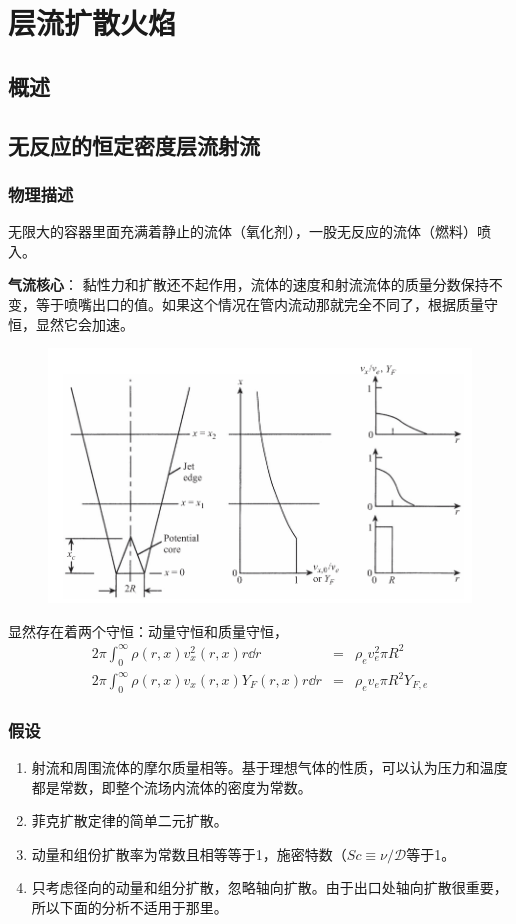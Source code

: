 
\section{层流扩散火焰}

\subsection{概述}
\subsection{无反应的恒定密度层流射流}
\subsubsection{物理描述}
无限大的容器里面充满着静止的流体（氧化剂），一股无反应的流体（燃料）喷入。

\textbf{气流核心}： 黏性力和扩散还不起作用，流体的速度和射流流体的质量分数保持不变，等于喷嘴出口的值。{\tiny 如果这个情况在管内流动那就完全不同了，根据质量守恒，显然它会加速。}

\begin{figure}[H]
    \centering
    \includegraphics[width=.3\textwidth]{img/laminar_jet.png}
\end{figure}

显然存在着两个守恒：动量守恒和质量守恒，
\begin{eqnarray}
    2\pi\int_0^\infty \rho(r,x)v_x^2(r,x)r\dd r &=& \rho_e v_e^2\pi R^2\\
    2\pi\int_0^\infty \rho(r,x)v_x(r,x)Y_F(r,x)r\dd r &=& \rho_e v_e \pi R^2 Y_{F,e}
\end{eqnarray}

\subsubsection{假设}
\begin{enumerate}
    \item 射流和周围流体的摩尔质量相等。基于理想气体的性质，可以认为压力和温度都是常数，即整个流场内流体的密度为常数。
    \item 菲克扩散定律的简单二元扩散。
    \item 动量和组份扩散率为常数且相等等于1，施密特数（\(Sc\equiv \nu/\mathcal{D}\)等于1。
    \item 只考虑径向的动量和组分扩散，忽略轴向扩散。由于出口处轴向扩散很重要，所以下面的分析不适用于那里。
\end{enumerate}

